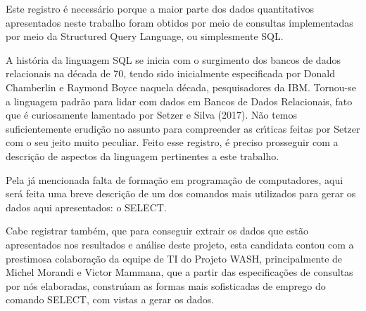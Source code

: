 \documentclass[
12pt,		%
openright,	%
twoside,  %
a4paper,			%
chapter=TITLE,		%
english,			%
french,				%
spanish,			%
brazil				%
]{USPSC-classe/USPSC}
\begin{document}
Este registro \'e necess\'ario porque a maior parte dos dados quantitativos apresentados neste trabalho foram obtidos por meio de consultas implementadas por meio da Structured Query Language, ou simplesmente SQL.














A hist\'oria da linguagem SQL se inicia com o surgimento dos bancos de dados relacionais na d\'ecada de 70, tendo sido inicialmente especificada por Donald Chamberlin e Raymond Boyce naquela d\'ecada, pesquisadores da IBM. Tornou-se a linguagem padr\~ao para lidar com dados em Bancos de Dados Relacionais, fato que \'e curiosamente lamentado por  Setzer e Silva (2017). N\~ao temos suficientemente erudi\c{c}\~ao no assunto para compreender as cr\'{\i}ticas feitas por Setzer com o seu jeito muito peculiar. Feito esse registro, \'e preciso prosseguir com a descri\c{c}\~ao de aspectos da linguagem pertinentes a este trabalho.














Pela j\'a mencionada falta de forma\c{c}\~ao em programa\c{c}\~ao de computadores, aqui ser\'a feita uma breve descri\c{c}\~ao de um dos comandos mais utilizados para gerar os dados aqui apresentados: o SELECT.














Cabe registrar tamb\'em, que para conseguir extrair os dados que est\~ao apresentados nos resultados e an\'alise deste projeto, esta candidata contou com a prestimosa colabora\c{c}\~ao da equipe de TI do Projeto WASH, principalmente de Michel Morandi e Victor Mammana, que a partir das especifica\c{c}\~oes de consultas por n\'os elaboradas, constru\'{\i}am as formas mais sofisticadas de emprego do comando SELECT, com vistas a gerar os dados.
\end{document}
